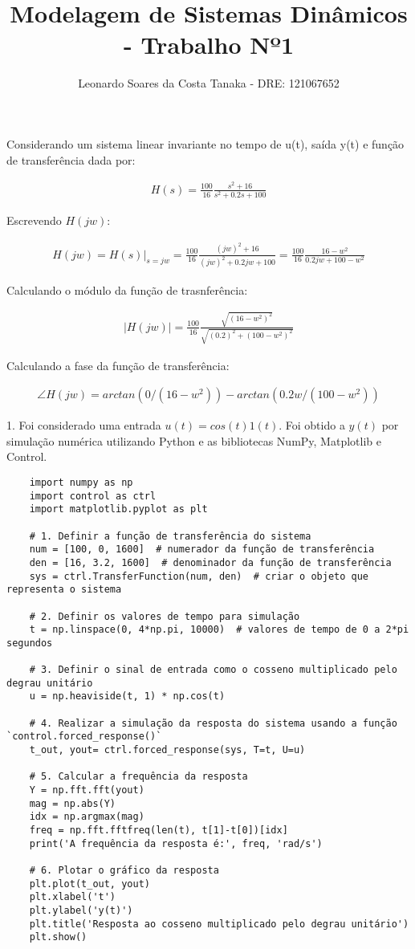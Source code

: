 \documentclass[10pt]{article}
\title{Modelagem de Sistemas Dinâmicos - Trabalho Nº1}
\author{
    Leonardo Soares da Costa Tanaka - DRE: 121067652
}
\date{}
\begin{document}
\maketitle
\thispagestyle{capa}
\newpage

Considerando um sistema linear invariante no tempo de u(t), saída y(t) e 
função de transferência dada por:

\begin{align*}
    H(s) = \frac{100}{16} \frac{s^2 + 16}{s^2 + 0.2s + 100}
\end{align*}

Escrevendo $H(jw)$:

\begin{align*}
    H(jw) = H(s)|_{s=jw} = \frac{100}{16} \frac{(jw)^2 + 16}{(jw)^2 + 0.2jw + 100} = \frac{100}{16} \frac{16 - w^2}{0.2jw + 100 - w^2}
\end{align*}

Calculando o módulo da função de trasnferência:

\begin{align*}
    |H(jw)| = \frac{100}{16} \frac{\sqrt{(16 - w^2)^2}}{\sqrt{(0.2)^2 + (100 - w^2)^2}}
\end{align*}

Calculando a fase da função de transferência:

\begin{align*}
    \angle H(jw) = arctan(0/(16 - w^2)) - arctan(0.2w/(100 - w^2))
\end{align*}

1. Foi considerado uma entrada $u(t) = cos(t) 1(t)$. Foi obtido a $y(t)$ por simulação numérica utilizando Python
e as bibliotecas NumPy, Matplotlib e Control.

\begin{verbatim}
    import numpy as np
    import control as ctrl
    import matplotlib.pyplot as plt
    
    # 1. Definir a função de transferência do sistema
    num = [100, 0, 1600]  # numerador da função de transferência
    den = [16, 3.2, 1600]  # denominador da função de transferência
    sys = ctrl.TransferFunction(num, den)  # criar o objeto que representa o sistema
    
    # 2. Definir os valores de tempo para simulação
    t = np.linspace(0, 4*np.pi, 10000)  # valores de tempo de 0 a 2*pi segundos
    
    # 3. Definir o sinal de entrada como o cosseno multiplicado pelo degrau unitário
    u = np.heaviside(t, 1) * np.cos(t)
    
    # 4. Realizar a simulação da resposta do sistema usando a função `control.forced_response()`
    t_out, yout= ctrl.forced_response(sys, T=t, U=u)
    
    # 5. Calcular a frequência da resposta
    Y = np.fft.fft(yout)
    mag = np.abs(Y)
    idx = np.argmax(mag)
    freq = np.fft.fftfreq(len(t), t[1]-t[0])[idx]
    print('A frequência da resposta é:', freq, 'rad/s')
    
    # 6. Plotar o gráfico da resposta
    plt.plot(t_out, yout)
    plt.xlabel('t')
    plt.ylabel('y(t)')
    plt.title('Resposta ao cosseno multiplicado pelo degrau unitário')
    plt.show()    
\end{verbatim}
\end{document}
